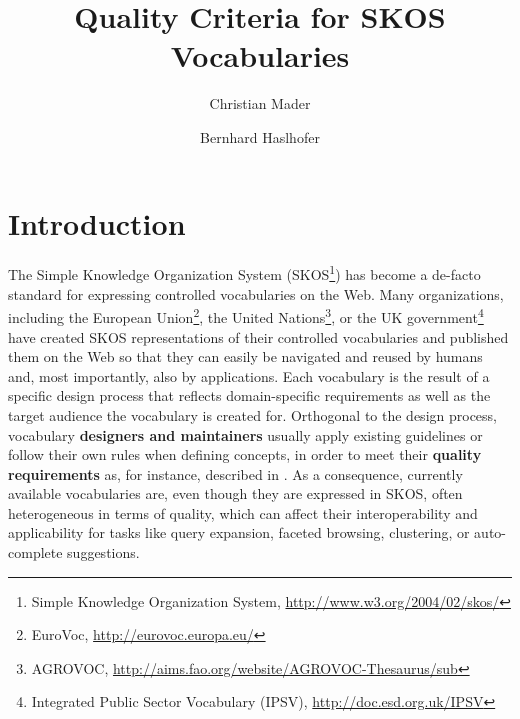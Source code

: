 \documentclass{llncs}
\title{Quality Criteria for SKOS Vocabularies}
\author{Christian Mader\inst{1} \and Bernhard Haslhofer\inst{2}}
\institute{
	University of Vienna, Faculty of Computer Science\\\email{christian.mader@univie.ac.at}
	\and Cornell University, Information Science\\\email{bernhard.haslhofer@cornell.edu}}
\begin{document}
\maketitle

\begin{abstract}
\end{abstract}

\section{Introduction}
The Simple Knowledge Organization System (SKOS\footnote{Simple Knowledge Organization System, \url{http://www.w3.org/2004/02/skos/}}) has become a de-facto standard for expressing controlled vocabularies on the Web. Many organizations, including the European Union\footnote{EuroVoc, \url{http://eurovoc.europa.eu/}}, the United Nations\footnote{AGROVOC, \url{http://aims.fao.org/website/AGROVOC-Thesaurus/sub}}, or the UK government\footnote{Integrated Public Sector Vocabulary (IPSV), \url{http://doc.esd.org.uk/IPSV}} have created SKOS representations of their controlled vocabularies and published them on the Web so that they can easily be navigated and reused by humans and, most importantly, also by applications. Each vocabulary is the result of a specific design process that reflects domain-specific requirements as well as the target audience the vocabulary is created for. Orthogonal to the design process, vocabulary \textbf{designers and maintainers} usually apply existing guidelines or follow their own rules when defining concepts, in order to meet their \textbf{quality requirements} as, for instance, described in \cite{Coronado2009}. As a consequence, currently available vocabularies are, even though they are expressed in SKOS, often heterogeneous in terms of quality, which can affect their interoperability and applicability for tasks like query expansion, faceted browsing, clustering, or auto-complete suggestions.
\end{document}
